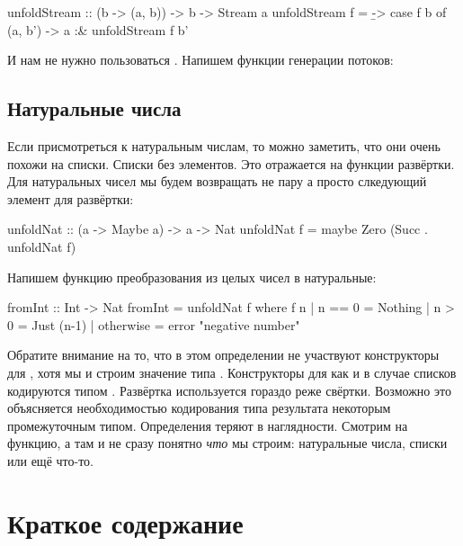 \begin{code}
unfoldStream :: (b -> (a, b)) -> b -> Stream a
unfoldStream f  = \b -> case f b of
    (a, b') -> a :& unfoldStream f b'
\end{code}

И нам не нужно пользоваться . 
Напишем функции генерации потоков:


\subsection{Натуральные числа}

Если присмотреться к натуральным числам, то можно
заметить, что они очень похожи на списки. Списки без элементов.
Это отражается на функции развёртки. Для натуральных
чисел мы будем возвращать не пару а просто слкедующий
элемент для развёртки:

\begin{code}
unfoldNat :: (a -> Maybe a) -> a -> Nat
unfoldNat f = maybe Zero (Succ . unfoldNat f)
\end{code}

Напишем функцию преобразования из целых чисел в натуральные:


\begin{code}
fromInt :: Int -> Nat
fromInt = unfoldNat f
    where f n
            | n == 0    = Nothing
            | n >  0    = Just (n-1)
            | otherwise = error "negative number"
\end{code}

Обратите внимание на то, что в этом определении не
участвуют конструкторы для , хотя мы и строим
значение типа . Конструкторы для  
как и в случае списков кодируются типом .
Развёртка используется гораздо реже свёртки. 
Возможно это объясняется необходимостью кодирования 
типа результата некоторым промежуточным типом. 
Определения теряют в наглядности. Смотрим на функцию,
а там  и не сразу понятно \emph{что} мы строим:
натуральные числа, списки или ещё что-то.

\section{Краткое содержание}


